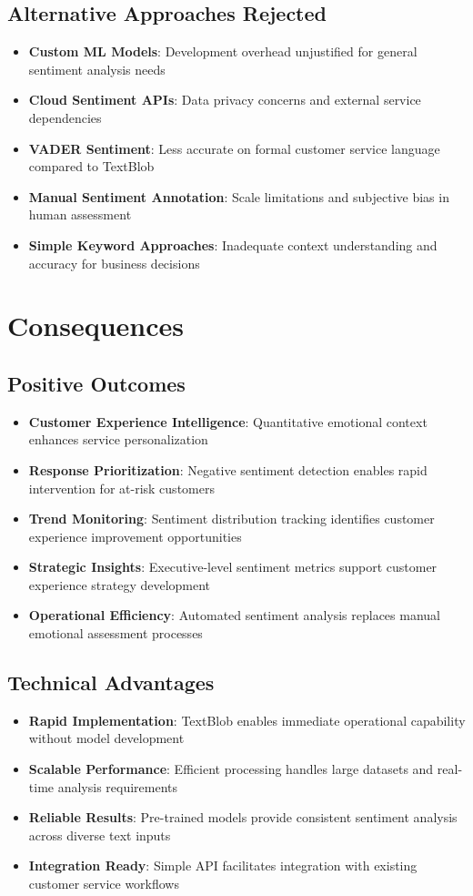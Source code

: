 \documentclass[11pt]{article}
\begin{document}
\subsection{Alternative Approaches Rejected}
\begin{itemize}
\item \textbf{Custom ML Models}: Development overhead unjustified for general sentiment analysis needs
\item \textbf{Cloud Sentiment APIs}: Data privacy concerns and external service dependencies
\item \textbf{VADER Sentiment}: Less accurate on formal customer service language compared to TextBlob
\item \textbf{Manual Sentiment Annotation}: Scale limitations and subjective bias in human assessment
\item \textbf{Simple Keyword Approaches}: Inadequate context understanding and accuracy for business decisions
\end{itemize}

\section{Consequences}

\subsection{Positive Outcomes}
\begin{itemize}
\item \textbf{Customer Experience Intelligence}: Quantitative emotional context enhances service personalization
\item \textbf{Response Prioritization}: Negative sentiment detection enables rapid intervention for at-risk customers
\item \textbf{Trend Monitoring}: Sentiment distribution tracking identifies customer experience improvement opportunities
\item \textbf{Strategic Insights}: Executive-level sentiment metrics support customer experience strategy development
\item \textbf{Operational Efficiency}: Automated sentiment analysis replaces manual emotional assessment processes
\end{itemize}

\subsection{Technical Advantages}
\begin{itemize}
\item \textbf{Rapid Implementation}: TextBlob enables immediate operational capability without model development
\item \textbf{Scalable Performance}: Efficient processing handles large datasets and real-time analysis requirements
\item \textbf{Reliable Results}: Pre-trained models provide consistent sentiment analysis across diverse text inputs
\item \textbf{Integration Ready}: Simple API facilitates integration with existing customer service workflows
\end{itemize}
\end{document}
